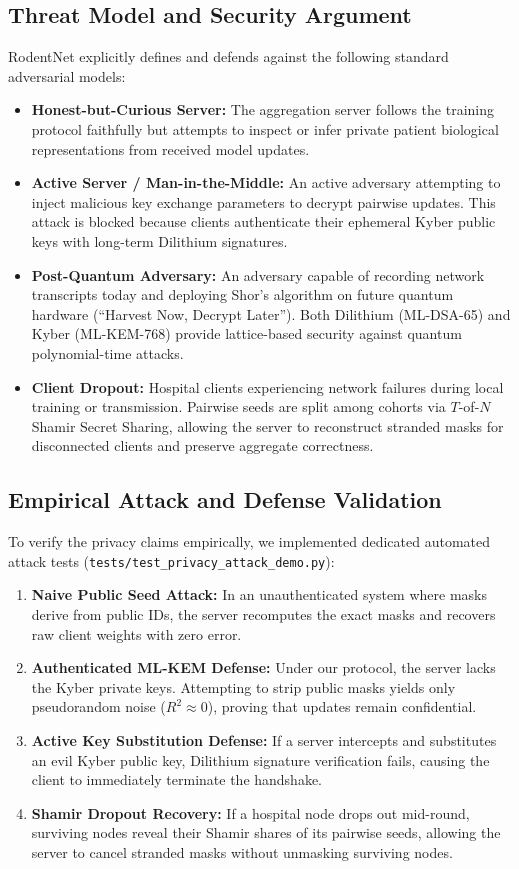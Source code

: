 \documentclass[11pt,a4paper]{article}
\begin{document}
\subsection{Threat Model and Security Argument}
RodentNet explicitly defines and defends against the following standard adversarial models:
\begin{itemize}[itemsep=2pt]
  \item \textbf{Honest-but-Curious Server:} The aggregation server follows the training protocol faithfully but attempts to inspect or infer private patient biological representations from received model updates.
  \item \textbf{Active Server / Man-in-the-Middle:} An active adversary attempting to inject malicious key exchange parameters to decrypt pairwise updates. This attack is blocked because clients authenticate their ephemeral Kyber public keys with long-term Dilithium signatures.
  \item \textbf{Post-Quantum Adversary:} An adversary capable of recording network transcripts today and deploying Shor's algorithm on future quantum hardware (``Harvest Now, Decrypt Later''). Both Dilithium (ML-DSA-65) and Kyber (ML-KEM-768) provide lattice-based security against quantum polynomial-time attacks.
  \item \textbf{Client Dropout:} Hospital clients experiencing network failures during local training or transmission. Pairwise seeds are split among cohorts via $T$-of-$N$ Shamir Secret Sharing, allowing the server to reconstruct stranded masks for disconnected clients and preserve aggregate correctness.
\end{itemize}

\subsection{Empirical Attack and Defense Validation}
To verify the privacy claims empirically, we implemented dedicated automated attack tests (\lstinline|tests/test_privacy_attack_demo.py|):
\begin{enumerate}[itemsep=2pt]
  \item \textbf{Naive Public Seed Attack:} In an unauthenticated system where masks derive from public IDs, the server recomputes the exact masks and recovers raw client weights with zero error.
  \item \textbf{Authenticated ML-KEM Defense:} Under our protocol, the server lacks the Kyber private keys. Attempting to strip public masks yields only pseudorandom noise ($R^2 \approx 0$), proving that updates remain confidential.
  \item \textbf{Active Key Substitution Defense:} If a server intercepts and substitutes an evil Kyber public key, Dilithium signature verification fails, causing the client to immediately terminate the handshake.
  \item \textbf{Shamir Dropout Recovery:} If a hospital node drops out mid-round, surviving nodes reveal their Shamir shares of its pairwise seeds, allowing the server to cancel stranded masks without unmasking surviving nodes.
\end{enumerate}
\end{document}
